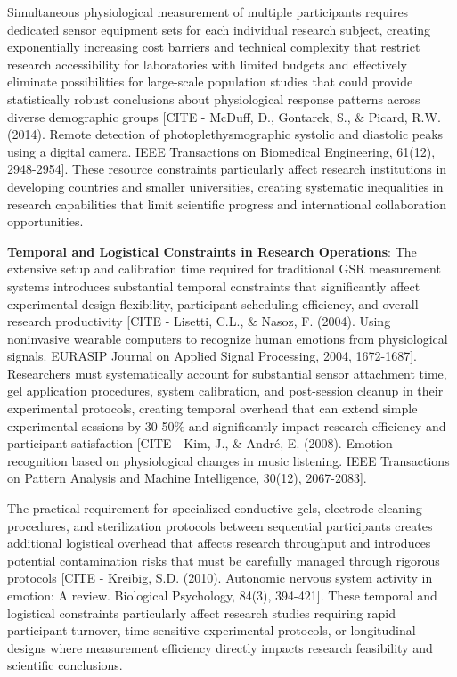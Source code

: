 \documentclass[12pt,a4paper]{report}
\begin{document}
Simultaneous physiological measurement of multiple participants requires dedicated sensor equipment sets for each
individual research subject, creating exponentially increasing cost barriers and technical complexity that restrict
research accessibility for laboratories with limited budgets and effectively eliminate possibilities for large-scale
population studies that could provide statistically robust conclusions about physiological response patterns across
diverse demographic
groups [CITE - McDuff, D., Gontarek, S., \& Picard, R.W. (2014). Remote detection of photoplethysmographic systolic and diastolic peaks using a digital camera. IEEE Transactions on Biomedical Engineering, 61(12), 2948-2954].
These resource constraints particularly affect research institutions in developing countries and smaller universities,
creating systematic inequalities in research capabilities that limit scientific progress and international collaboration
opportunities.

\textbf{Temporal and Logistical Constraints in Research Operations}: The extensive setup and calibration time required for
traditional GSR measurement systems introduces substantial temporal constraints that significantly affect experimental
design flexibility, participant scheduling efficiency, and overall research
productivity [CITE - Lisetti, C.L., \& Nasoz, F. (2004). Using noninvasive wearable computers to recognize human emotions from physiological signals. EURASIP Journal on Applied Signal Processing, 2004, 1672-1687].
Researchers must systematically account for substantial sensor attachment time, gel application procedures, system
calibration, and post-session cleanup in their experimental protocols, creating temporal overhead that can extend simple
experimental sessions by 30-50\% and significantly impact research efficiency and participant
satisfaction [CITE - Kim, J., \& André, E. (2008). Emotion recognition based on physiological changes in music listening. IEEE Transactions on Pattern Analysis and Machine Intelligence, 30(12), 2067-2083].

The practical requirement for specialized conductive gels, electrode cleaning procedures, and sterilization protocols
between sequential participants creates additional logistical overhead that affects research throughput and introduces
potential contamination risks that must be carefully managed through rigorous
protocols [CITE - Kreibig, S.D. (2010). Autonomic nervous system activity in emotion: A review. Biological Psychology, 84(3), 394-421].
These temporal and logistical constraints particularly affect research studies requiring rapid participant turnover,
time-sensitive experimental protocols, or longitudinal designs where measurement efficiency directly impacts research
feasibility and scientific conclusions.
\end{document}
